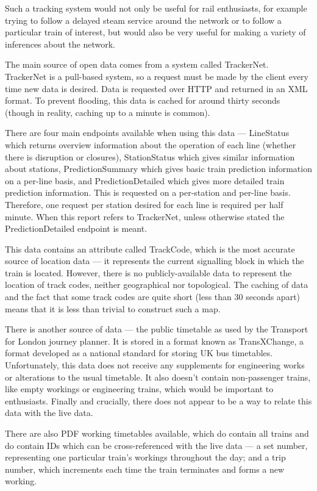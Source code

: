 \documentclass[a4paper,12pt,twoside]{report}
\begin{document}
Such a tracking system would not only be useful for rail enthusiasts, for
example trying to follow a delayed steam service around the network or to
follow a particular train of interest, but would also be very useful for making
a variety of inferences about the network.

The main source of open data comes from a system called TrackerNet. TrackerNet
is a pull-based system, so a request must be made by the client every time new
data is desired. Data is requested over HTTP and returned in an XML format. To
prevent flooding, this data is cached for around thirty seconds (though in
reality, caching up to a minute is common).

There are four main endpoints available when using this data --- LineStatus
which returns overview information about the operation of each line (whether
there is disruption or closures), StationStatus which gives similar information
about stations, PredictionSummary which gives basic train prediction
information on a per-line basis, and PredictionDetailed which gives more
detailed train prediction information. This is requested on a per-station and
per-line basis\cite{TrackerNetSpec}. Therefore, one request per station desired
for each line is required per half minute. When this report refers to
TrackerNet, unless otherwise stated the PredictionDetailed endpoint is meant.

This data contains an attribute called TrackCode, which is the most accurate
source of location data --- it represents the current signalling block in which
the train is located. However, there is no publicly-available data to represent
the location of track codes, neither geographical nor topological. The caching
of data and the fact that some track codes are quite short (less than 30
seconds apart) means that it is less than trivial to construct such a map.

There is another source of data --- the public timetable as used by the
Transport for London journey planner. It is stored in a format known as
TransXChange, a format developed as a national standard for storing UK bus
timetables\cite{TransXChangeSpec}. Unfortunately, this data does not receive
any supplements for engineering works or alterations to the usual timetable. It
also doesn't contain non-passenger trains, like empty workings or engineering
trains, which would be important to enthusiasts. Finally and crucially, there
does not appear to be a way to relate this data with the live data.

There are also PDF working timetables available\cite{TfLWTT}, which do contain
all trains and do contain IDs which can be cross-referenced with the live data
--- a set number, representing one particular train's workings throughout the
day; and a trip number, which increments each time the train terminates and
forms a new working.
\end{document}
